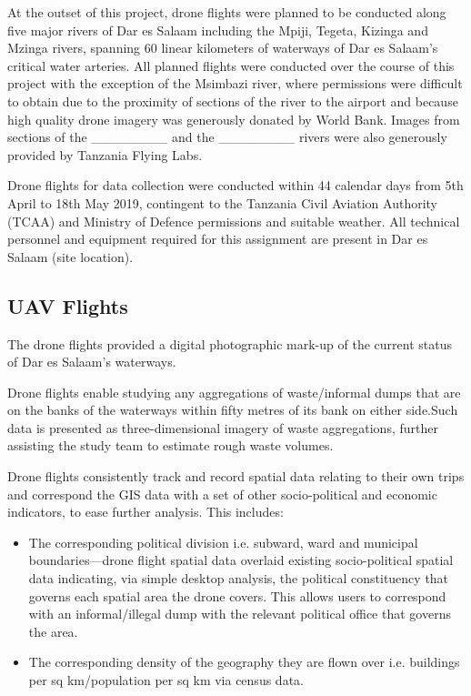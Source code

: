 \documentclass[a4paper,12pt,twoside]{article}
\begin{document}
    At the outset of this project, drone flights were planned to be  conducted along five major rivers of Dar es Salaam including the Mpiji, Tegeta, Kizinga and Mzinga rivers, spanning 60 linear kilometers of waterways of Dar es Salaam’s critical water arteries. All planned flights were conducted over the course of this project with the exception of the Msimbazi river, where permissions were difficult to obtain due to the proximity of sections of the river to the airport and because high quality drone imagery was generously donated by World Bank. Images from sections of the ________ and the ________ rivers were also generously provided by Tanzania Flying Labs.
    
    Drone flights for data collection were conducted within 44 calendar days from 5th April to 18th May 2019, contingent to the Tanzania Civil Aviation Authority (TCAA) and Ministry of Defence permissions and suitable weather. All technical personnel and equipment required for this assignment are present in Dar es Salaam (site location). 

\subsection{UAV Flights}
    The drone flights provided a digital photographic mark-up of the current status of Dar es Salaam’s waterways. 
    
    Drone flights enable studying any aggregations of waste/informal dumps that are on the banks of the waterways within fifty metres of its bank on either side.Such data is presented as three-dimensional imagery of waste aggregations, further assisting the study team to estimate rough waste volumes.  

    Drone flights consistently track and record spatial data relating to their own trips and correspond the GIS data with a set of other socio-political and economic indicators, to ease further analysis. This includes:
    \begin{itemize}
        \item The corresponding political division i.e. subward, ward and municipal boundaries—drone flight spatial data overlaid existing socio-political spatial data indicating, via simple desktop analysis, the political constituency that governs each spatial area the drone covers. This allows users to correspond with an informal/illegal dump with the relevant political office that governs the area.
        \item The corresponding density of the geography they are flown over i.e. buildings per sq km/population per sq km via census data.
    \end{itemize}  
\end{document}
